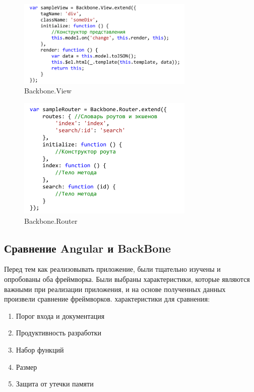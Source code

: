 \begin{figure}[ht]
\center\includegraphics[width=0.75\textwidth]{view}
\caption{Backbone.View}\label{view}
\end{figure}

\begin{figure}[ht]
\center\includegraphics[width=0.75\textwidth]{router}
\caption{Backbone.Router}\label{router}
\end{figure}

\subsection {Сравнение Angular и BackBone}

Перед тем как реализовывать приложение, были тщательно изучены и опробованы оба фреймворка. Были выбраны характеристики, которые являются важными при реализации приложения, и на основе полученных данных произвели сравнение фреймворков. характеристики для сравнения:
\begin {enumerate}
\item Порог входа и документация
\item Продуктивность разработки
\item Набор функций
\item Размер 
\item Защита от утечки памяти 
\end {enumerate}


